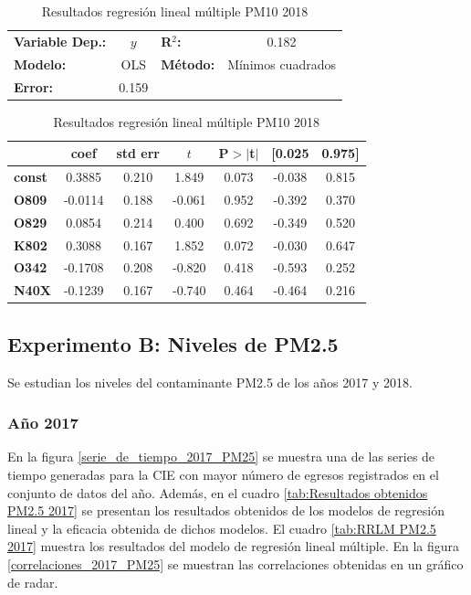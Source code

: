 \begin{table}[hbt!]
\caption{Resultados regresión lineal múltiple PM10 2018}
\label{tab:RRLM PM10 2018}
\begin{center}
\begin{tabular}{lclc}
\toprule
\textbf{Variable Dep.:}    &        $y$         & \textbf{  R$^2$:         } &     0.182   \\
\textbf{Modelo:}            &       OLS        & \textbf{Método:}           &  Mínimos cuadrados  \\
\textbf{Error:}            & 0.159  \\
\bottomrule
\end{tabular}
\begin{tabular}{lcccccc}
               & \textbf{coef} & \textbf{std err} & \textbf{$t$} & \textbf{P$> |$t$|$} & \textbf{[0.025} & \textbf{0.975]}  \\
\midrule
\textbf{const} &       0.3885  &        0.210     &     1.849  &         0.073        &       -0.038    &        0.815     \\
\textbf{O809}  &      -0.0114  &        0.188     &    -0.061  &         0.952        &       -0.392    &        0.370     \\
\textbf{O829}  &       0.0854  &        0.214     &     0.400  &         0.692        &       -0.349    &        0.520     \\
\textbf{K802}  &       0.3088  &        0.167     &     1.852  &         0.072        &       -0.030    &        0.647     \\
\textbf{O342}  &      -0.1708  &        0.208     &    -0.820  &         0.418        &       -0.593    &        0.252     \\
\textbf{N40X}  &      -0.1239  &        0.167     &    -0.740  &         0.464        &       -0.464    &        0.216     \\
\bottomrule
\end{tabular}
\end{center}
\end{table}


\clearpage
\subsection{Experimento B: Niveles de PM2.5}
Se estudian los niveles del contaminante PM2.5 de los años 2017 y 2018.

\subsubsection{Año 2017}
En la figura \ref{serie_de_tiempo_2017_PM25} se muestra una de las series de tiempo generadas para la CIE con mayor número de egresos registrados en el conjunto de datos del año. Además, en el cuadro \ref{tab:Resultados obtenidos PM2.5 2017} se presentan los resultados obtenidos de los modelos de regresión lineal y la eficacia obtenida de dichos modelos. El cuadro \ref{tab:RRLM PM2.5 2017} muestra los resultados del modelo de regresión lineal múltiple. En la figura \ref{correlaciones_2017_PM25} se muestran las correlaciones obtenidas en un gráfico de radar.

